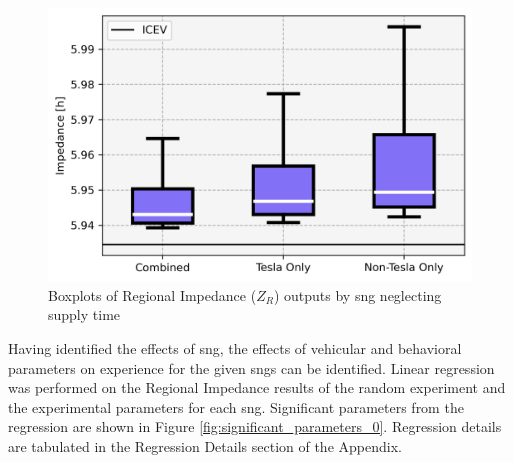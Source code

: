 \begin{multicols}{2}
\begin{figure}[H]
	\centering
	\includegraphics[width = \linewidth]{figs/Networks_Boxplots_Impedance_Driving.png}
	\caption{Boxplots of Regional Impedance ($Z_R$) outputs by \gls{sng} neglecting supply time}
	\label{fig:networks_boxplots_driving}
\end{figure}

Having identified the effects of \gls{sng}, the effects of vehicular and behavioral parameters on experience for the given \glspl{sng} can be identified. Linear regression was performed on the Regional Impedance results of the random experiment and the experimental parameters for each \gls{sng}. Significant parameters from the regression are shown in Figure \ref{fig:significant_parameters_0}. Regression details are tabulated in the Regression Details section of the Appendix. 

\end{multicols}

